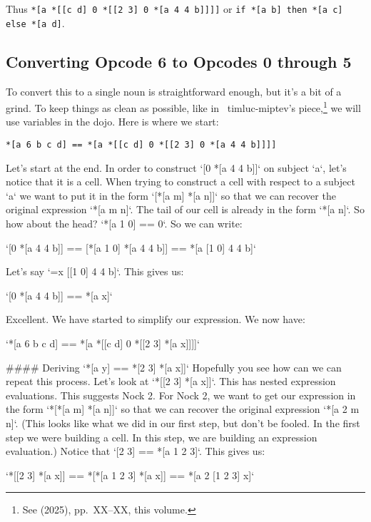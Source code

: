 \documentclass[twoside]{article}
\begin{document}
Thus \lstinline[style=inlinecode]{*[a *[[c d] 0 *[[2 3] 0 *[a 4 4 b]]]]} or \lstinline[style=inlinecode]{if *[a b] then *[a c] else *[a d]}.

\subsection{Converting Opcode 6 to Opcodes 0 through 5}

To convert this to a single noun is straightforward enough, but it's a bit of a grind. To keep things as clean as possible, like in ~timluc-miptev's piece,\footnote{See  (2025), pp.~XX--XX, this volume.} we will use variables in the dojo. Here is where we start:

\begin{lstlisting}[style=listingblock]
*[a 6 b c d] == *[a *[[c d] 0 *[[2 3] 0 *[a 4 4 b]]]]
\end{lstlisting}

Let's start at the end. In order to construct `[0 *[a 4 4 b]]` on subject `a`, let's notice that it is a cell. When trying to construct a cell with respect to a subject `a` we want to put it in the form `[*[a m] *[a n]]` so that we can recover the original expression `*[a m n]`. The tail of our cell is already in the form `*[a n]`. So how about the head? `*[a 1 0] == 0`. So we can write: 

`[0 *[a 4 4 b]] == [*[a 1 0] *[a 4 4 b]] == *[a [1 0] 4 4 b]`

Let's say `=x [[1 0] 4 4 b]`. This gives us:

`[0 *[a 4 4 b]] == *[a x]`

Excellent. We have started to simplify our expression. We now have:

`*[a 6 b c d] == *[a *[[c d] 0 *[[2 3] *[a x]]]]`

#### Deriving `*[a y] == *[2 3] *[a x]]`
Hopefully you see how can we can repeat this process. Let's look at `*[[2 3] *[a x]]`. This has nested expression evaluations. This suggests Nock 2. For Nock 2, we want to get our expression in the form `*[*[a m] *[a n]]` so that we can recover the original expression `*[a 2 m n]`. (This looks like what we did in our first step, but don't be fooled. In the first step we were building a cell. In this step, we are building an expression evaluation.) Notice that `[2 3] == *[a 1 2 3]`. This gives us:

`*[[2 3] *[a x]] == *[*[a 1 2 3] *[a x]] == *[a 2 [1 2 3] x]`
\end{document}
